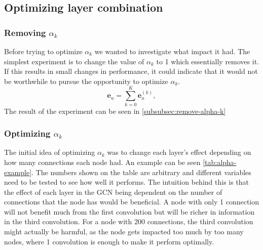 \subsection{Optimizing layer combination}
\subsubsection{Removing $\alpha_k$}
Before trying to optimize $\alpha_k$ we wanted to investigate what impact it had.
The simplest experiment is to change the value of $\alpha_k$ to 1 which essentially removes it.
If this results in small changes in performance, it could indicate that it would not be worthwhile to pursue the opportunity to optimize $\alpha_k$.
\begin{equation}
    \mathbf{e}_u = \sum_{k=0}^{K} \mathbf{e}_u^{(k)},
    \label{eq:lightgcn-sum}
\end{equation}
The result of the experiment can be seen in \autoref{subsubsec:remove-alpha-k}

\subsubsection{Optimizing $\alpha_k$}
The initial idea of optimizing $\alpha_k$ was to change each layer's effect depending on how many connections each node had.
An example can be seen \autoref{tab:alpha-example}.
The numbers shown on the table are arbitrary and different variables need to be tested to see how well it performs.
The intuition behind this is that the effect of each layer in the GCN being dependent on the number of connections that the node has would be beneficial.
A node with only 1 connection will not benefit much from the first convolution but will be richer in information in the third convolution.
For a node with 200 connections, the third convolution might actually be harmful, as the node gets impacted too much by too many nodes, where 1 convolution is enough to make it perform optimally.

